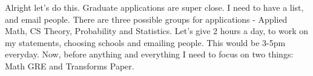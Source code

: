 \noindent {}

Alright let's do this. Graduate applications are super close. I need to have a list, and email people. There are three possible groups for applications - Applied Math, CS Theory, Probability and Statistics. Let's give 2 hours a day, to work on my statements, choosing schools and emailing people. This would be 3-5pm everyday. Now, before anything and everything I need to focus on two things: Math GRE and Transforms Paper.